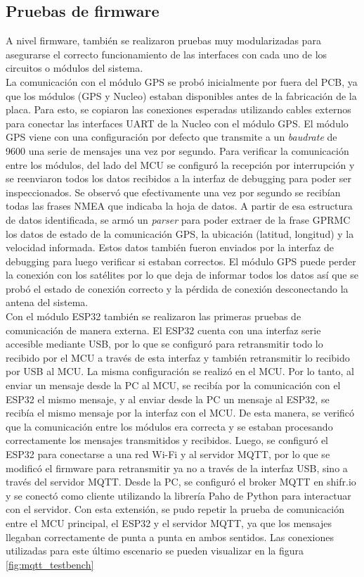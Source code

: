 \subsection{Pruebas de firmware}

A nivel firmware, también se realizaron pruebas muy modularizadas para asegurarse el correcto funcionamiento de las interfaces con cada uno de los circuitos o módulos del sistema. \\ 

La comunicación con el módulo GPS se probó inicialmente por fuera del PCB, ya que los módulos (GPS y Nucleo) estaban disponibles antes de la fabricación de la placa. Para esto, se copiaron las conexiones esperadas utilizando cables externos para conectar las interfaces UART de la Nucleo con el módulo GPS. El módulo GPS viene con una configuración por defecto que transmite a un \textit{baudrate} de 9600 una serie de mensajes una vez por segundo. Para verificar la comunicación entre los módulos, del lado del MCU se configuró la recepción por interrupción y se reenviaron todos los datos recibidos a la interfaz de debugging para poder ser inspeccionados. Se observó que efectivamente una vez por segundo se recibían todas las frases NMEA que indicaba la hoja de datos. A partir de esa estructura de datos identificada, se armó un \textit{parser} para poder extraer de la frase GPRMC los datos de estado de la comunicación GPS, la ubicación (latitud, longitud) y la velocidad informada. Estos datos también fueron enviados por la interfaz de debugging para luego verificar si estaban correctos. El módulo GPS puede perder la conexión con los satélites por lo que deja de informar todos los datos así que se probó el estado de conexión correcto y la pérdida de conexión desconectando la antena del sistema. \\ 

Con el módulo ESP32 también se realizaron las primeras pruebas de comunicación de manera externa. El ESP32 cuenta con una interfaz serie accesible mediante USB, por lo que se configuró para retransmitir todo lo recibido por el MCU a través de esta interfaz y también retransmitir lo recibido por USB al MCU. La misma configuración se realizó en el MCU. Por lo tanto, al enviar un mensaje desde la PC al MCU, se recibía por la comunicación con el ESP32 el mismo mensaje, y al enviar desde la PC un mensaje al ESP32, se recibía el mismo mensaje por la interfaz con el MCU. De esta manera, se verificó que la comunicación entre los módulos era correcta y se estaban procesando correctamente los mensajes transmitidos y recibidos. Luego, se configuró el ESP32 para conectarse a una red Wi-Fi y al servidor MQTT, por lo que se modificó el firmware para retransmitir ya no a través de la interfaz USB, sino a través del servidor MQTT. Desde la PC, se configuró el broker MQTT en shifr.io y se conectó como cliente utilizando la librería Paho \cite{paho} de Python para interactuar con el servidor. Con esta extensión, se pudo repetir la prueba de comunicación entre el MCU principal, el ESP32 y el servidor MQTT, ya que los mensajes llegaban correctamente de punta a punta en ambos sentidos. Las conexiones utilizadas para este último escenario se pueden visualizar en la figura \ref{fig:mqtt_testbench} 


